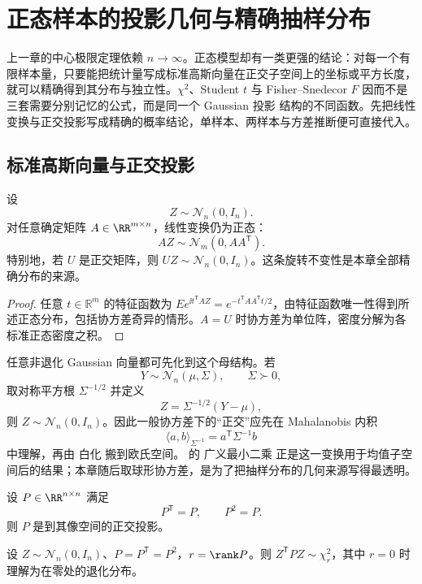 \chapter{正态样本的投影几何与精确抽样分布}\label{chap:math-stat-gaussian-sampling}

上一章的中心极限定理依赖 $n\to\infty$。正态模型却有一类更强的结论：对每一个有限样本量，只要能把统计量写成标准高斯向量在正交子空间上的坐标或平方长度，就可以精确得到其分布与独立性。$\chi^2$、Student $t$ 与 Fisher--Snedecor $F$ 因而不是三套需要分别记忆的公式，而是同一个 Gaussian 投影 结构的不同函数。先把线性变换与正交投影写成精确的概率结论，单样本、两样本与方差推断便可直接代入。

\section{标准高斯向量与正交投影}

\begin{proposition}[高斯线性像与旋转不变性]
设
\[
 Z\sim\mathcal N_n(0,I_n).
\]
对任意确定矩阵 $A\in\RR^{m\times n}$，线性变换仍为正态：
\[
 AZ\sim\mathcal N_m(0,AA^{\mathsf T}).
\]
特别地，若 $U$ 是正交矩阵，则 $UZ\sim\mathcal N_n(0,I_n)$。这条旋转不变性是本章全部精确分布的来源。
\end{proposition}
\begin{proof}
任意 $t\in\mathbb R^m$ 的特征函数为 $E e^{\ii t^{\mathsf T}AZ}=e^{-t^{\mathsf T}AA^{\mathsf T}t/2}$，由特征函数唯一性得到所述正态分布，包括协方差奇异的情形。$A=U$ 时协方差为单位阵，密度分解为各标准正态密度之积。
\end{proof}

任意非退化 Gaussian 向量都可先化到这个母结构。若
\[
 Y\sim\mathcal N_n(\mu,\Sigma),
 \qquad
 \Sigma\succ0,
\]
取对称平方根 $\Sigma^{-1/2}$ 并定义
\begin{equation*}Z=\Sigma^{-1/2}(Y-\mu),
\end{equation*}
则 $Z\sim\mathcal N_n(0,I_n)$。因此一般协方差下的“正交”应先在 Mahalanobis 内积
\[
 \langle a,b\rangle_{\Sigma^{-1}}
 =a^{\mathsf T}\Sigma^{-1}b
\]
中理解，再由 白化 搬到欧氏空间。 的 广义最小二乘 正是这一变换用于均值子空间后的结果；本章随后取球形协方差，是为了把抽样分布的几何来源写得最透明。

\begin{definition}[正交投影]
设 $P\in\RR^{n\times n}$ 满足
\[
 P^{\mathsf T}=P,
 \qquad
 P^2=P.
\]
则 $P$ 是到其像空间的正交投影。
\end{definition}
\begin{proposition}[投影平方长度的分布]
设 $Z\sim\mathcal N_n(0,I_n)$、$P=P^{\mathsf T}=P^2$，$r=\rank P$。则 $Z^{\mathsf T}PZ\sim\chi^2_r$，其中 $r=0$ 时理解为在零处的退化分布。
\end{proposition}

